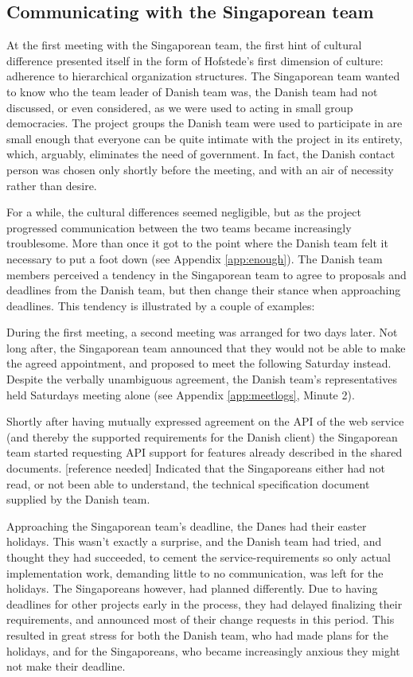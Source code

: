 \subsection{Communicating with the Singaporean team}
\label{sec:communicating}

At the first meeting with the Singaporean team, the first hint of
cultural difference presented itself in the form of Hofstede's first dimension
of culture: adherence to hierarchical organization structures\cite{surprises}.
The Singaporean team wanted to know who the team leader of Danish team was,
the Danish team had not discussed, or even considered, as
we were used to acting in small group democracies. The
project groups the Danish team were used to participate in are small enough
that everyone can be quite intimate with the project in its entirety, which,
arguably, eliminates the need of government. In fact, the Danish contact
person was chosen only shortly before the meeting, and with an air of necessity
rather than desire.

For a while, the cultural differences seemed negligible, but as the project
progressed communication between the two teams became increasingly troublesome.
More than once it got to the point where the Danish team felt it necessary to
put a foot down (see Appendix \ref{app:enough}). The Danish team members perceived a tendency
in the Singaporean team to agree to
proposals and deadlines from the Danish team, but then change their stance when
approaching deadlines. This tendency is illustrated by a couple of examples:

During the first meeting, a second meeting was arranged for two days later. Not
long after, the Singaporean team announced that they would not be able to make
the agreed appointment, and proposed to meet the following Saturday instead.
Despite the verbally unambiguous agreement, the Danish team's
representatives held Saturdays meeting alone (see Appendix \ref{app:meetlogs},
Minute 2).

Shortly after having mutually expressed
agreement on the API of the web service (and thereby the supported requirements
for the Danish client) the Singaporean team started requesting API support for
features already described in the shared documents. [reference needed]
Indicated that the Singaporeans either had not read, or not been able to
understand, the technical specification document supplied by the Danish team.

Approaching the Singaporean team's deadline, the Danes had their easter
holidays. This wasn't exactly a surprise, and the Danish team had tried, and
thought they had succeeded, to cement the service-requirements so only actual
implementation work, demanding little to no communication, was left for the
holidays. The Singaporeans however, had planned differently. Due to having
deadlines for other projects early in the process, they had delayed finalizing
their requirements, and announced most of their change requests in this period.
This resulted in great stress for both the Danish team, who had made plans for
the holidays, and for the Singaporeans, who became increasingly anxious they
might not make their deadline.

